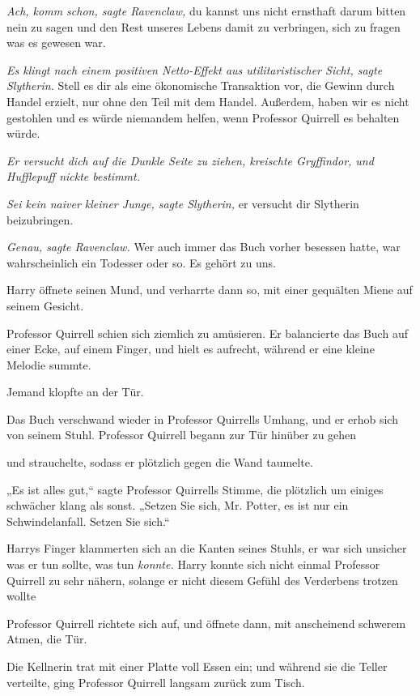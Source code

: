 {\emph{Ach, komm schon, sagte Ravenclaw,} du kannst uns nicht ernsthaft darum bitten nein zu sagen und den Rest unseres Lebens damit zu verbringen, sich zu fragen was es gewesen war.

\emph{Es klingt nach einem positiven Netto-Effekt aus utilitaristischer Sicht, sagte Slytherin.} Stell es dir als eine ökonomische Transaktion vor, die Gewinn durch Handel erzielt, nur ohne den Teil mit dem Handel. Außerdem, haben wir es nicht gestohlen und es würde niemandem helfen, wenn Professor Quirrell es behalten würde.

\emph{Er versucht dich auf die Dunkle Seite zu ziehen, kreischte Gryffindor, und Hufflepuff nickte bestimmt.}

\emph{Sei kein naiver kleiner Junge, sagte Slytherin,} er versucht dir Slytherin beizubringen.

\emph{Genau, sagte Ravenclaw.} Wer auch immer das Buch vorher besessen hatte, war wahrscheinlich ein Todesser oder so. Es gehört zu uns.

Harry öffnete seinen Mund, und verharrte dann so, mit einer gequälten Miene auf seinem Gesicht.

Professor Quirrell schien sich ziemlich zu amüsieren. Er balancierte das Buch auf einer Ecke, auf einem Finger, und hielt es aufrecht, während er eine kleine Melodie summte.

Jemand klopfte an der Tür.

Das Buch verschwand wieder in Professor Quirrells Umhang, und er erhob sich von seinem Stuhl. Professor Quirrell begann zur Tür hinüber zu gehen \later

\later und strauchelte, sodass er plötzlich gegen die Wand taumelte.

„Es ist alles gut,“ sagte Professor Quirrells Stimme, die plötzlich um einiges schwächer klang als sonst. „Setzen Sie sich, Mr. Potter, es ist nur ein Schwindelanfall. Setzen Sie sich.“

Harrys Finger klammerten sich an die Kanten seines Stuhls, er war sich unsicher was er tun sollte, was tun \emph{konnte.} Harry konnte sich nicht einmal Professor Quirrell zu sehr nähern, solange er nicht diesem Gefühl des Verderbens trotzen wollte \later

Professor Quirrell richtete sich auf, und öffnete dann, mit anscheinend schwerem Atmen, die Tür.

Die Kellnerin trat mit einer Platte voll Essen ein; und während sie die Teller verteilte, ging Professor Quirrell langsam zurück zum Tisch.

}
